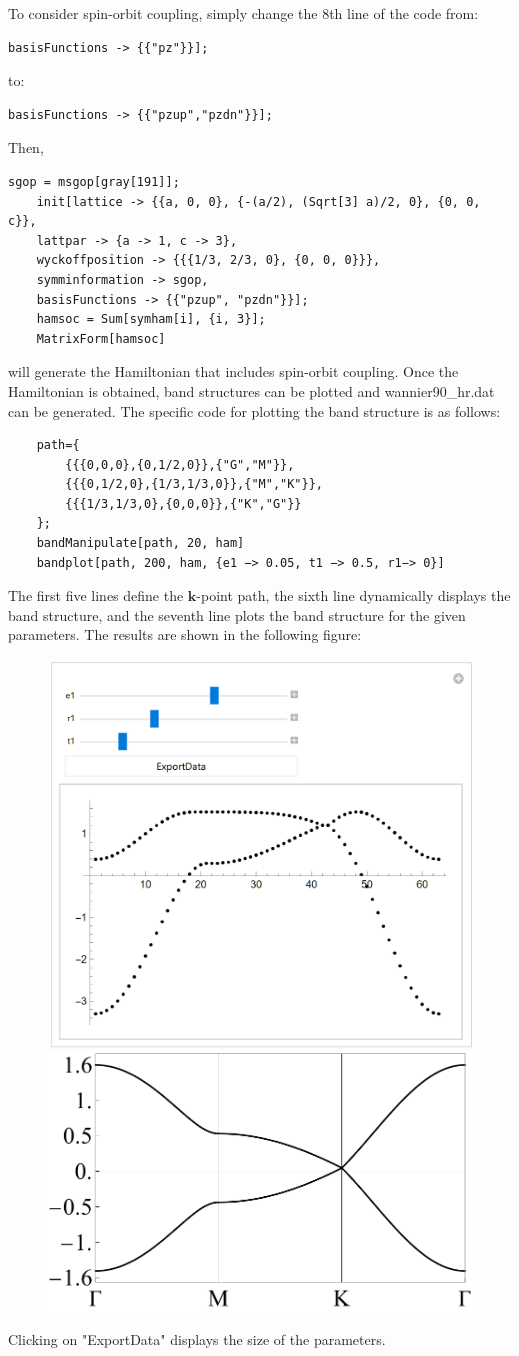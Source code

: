 \documentclass[titlepage,a4paper,12pt,AutoFakeBold]{article}
\begin{document}
To consider spin-orbit coupling, simply change the 8th line of the code from:

\begin{lstlisting}[numbers=none]
	basisFunctions -> {{"pz"}}];
\end{lstlisting}

to:

\begin{lstlisting}[numbers=none]
	basisFunctions -> {{"pzup","pzdn"}}];
\end{lstlisting}

Then,

\begin{lstlisting}[numbers=none]
	sgop = msgop[gray[191]];
	init[lattice -> {{a, 0, 0}, {-(a/2), (Sqrt[3] a)/2, 0}, {0, 0, c}},
	lattpar -> {a -> 1, c -> 3},
	wyckoffposition -> {{{1/3, 2/3, 0}, {0, 0, 0}}},
	symminformation -> sgop,
	basisFunctions -> {{"pzup", "pzdn"}}];
	hamsoc = Sum[symham[i], {i, 3}];
	MatrixForm[hamsoc]
\end{lstlisting}

will generate the Hamiltonian that includes spin-orbit coupling. Once the Hamiltonian is obtained, band structures can be plotted and wannier90\_hr.dat can be generated. The specific code for plotting the band structure is as follows:
\begin{lstlisting}
	path={
		{{{0,0,0},{0,1/2,0}},{"G","M"}},
		{{{0,1/2,0},{1/3,1/3,0}},{"M","K"}},
		{{{1/3,1/3,0},{0,0,0}},{"K","G"}}
	};
	bandManipulate[path, 20, ham]
	bandplot[path, 200, ham, {e1 −> 0.05, t1 −> 0.5, r1−> 0}]
\end{lstlisting}
The first five lines define the $\boldsymbol{k}$-point path, the sixth line dynamically displays the band structure, and the seventh line plots the band structure for the given parameters. The results are shown in the following figure:
\begin{figure}[H]
	\includegraphics[width=.45\textwidth]{./figures/bm}
	\includegraphics[width=.54\textwidth]{./figures/grabd}
\end{figure}
\noindent Clicking on "ExportData" displays the size of the parameters.
\end{document}
